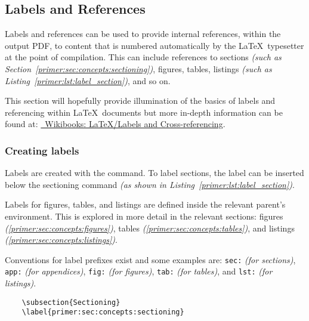 \subsection{Labels and References}
\label{primer:sec:concepts:labels_and_refs}
Labels and references can be used to provide internal references, within the output PDF, to content that is numbered automatically by the \LaTeX\ typesetter at the point of compilation. This can include references to sections \textit{(such as Section~\ref{primer:sec:concepts:sectioning})}, figures, tables, listings \textit{(such as Listing~\ref{primer:lst:label_section})}, and so on.

This section will hopefully provide illumination of the basics of labels and referencing within \LaTeX\ documents but more in-depth information can be found at: \href{https://en.wikibooks.org/wiki/LaTeX/Labels_and_Cross-referencing}{\faBook\ Wikibooks: \LaTeX{}/Labels and Cross-referencing}.

\subsubsection*{Creating labels}
Labels are created with the  command. To label sections, the label can be inserted below the sectioning command \textit{(as shown in Listing~\ref{primer:lst:label_section})}.

Labels for figures, tables, and listings are defined inside the relevant parent's environment. This is explored in more detail in the relevant sections: figures \textit{(\ref{primer:sec:concepts:figures})}, tables \textit{(\ref{primer:sec:concepts:tables})}, and listings \textit{(\ref{primer:sec:concepts:listings})}.

Conventions for label prefixes exist and some examples are: \texttt{sec:} \textit{(for sections)}, \texttt{app:} \textit{(for appendices)}, \texttt{fig:} \textit{(for figures)}, \texttt{tab:} \textit{(for tables)}, and \texttt{lst:} \textit{(for listings)}.


\begin{listing}[H]
  \captionsetup{skip=\skiplistingcaptionlen}
  \begin{verbatim}
    \subsection{Sectioning}
    \label{primer:sec:concepts:sectioning}
  \end{verbatim}
  \caption{\texttt{\textbackslash label} sectioning command example}
  \label{primer:lst:label_section}
\end{listing}


